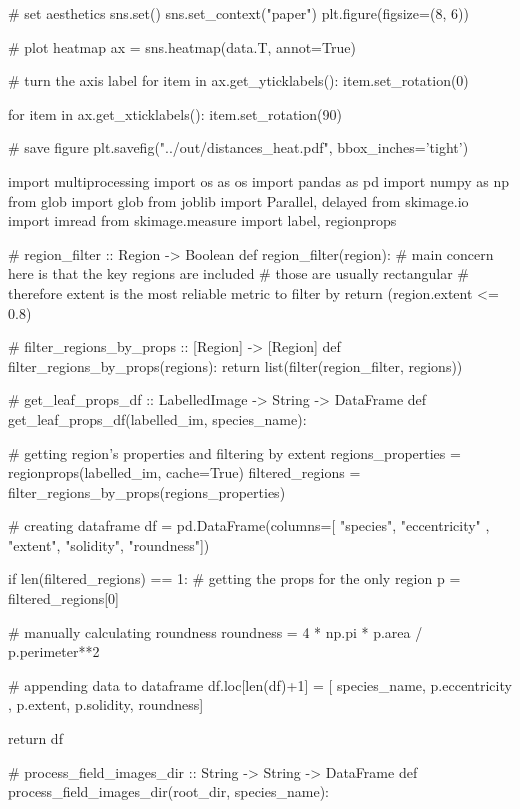 # set aesthetics
sns.set()
sns.set_context("paper")
plt.figure(figsize=(8, 6))

# plot heatmap
ax = sns.heatmap(data.T, annot=True)

# turn the axis label
for item in ax.get_yticklabels():
    item.set_rotation(0)

for item in ax.get_xticklabels():
    item.set_rotation(90)

# save figure
plt.savefig("../out/distances_heat.pdf", bbox_inches='tight')

\stopPYTHON

\subject{classify_field.py}

\startPYTHON
import multiprocessing
import os     as os
import pandas as pd
import numpy  as np
from   glob   import glob
from   joblib import Parallel, delayed
from   skimage.io         import imread
from   skimage.measure    import label, regionprops


# region_filter :: Region -> Boolean
def region_filter(region):
    # main concern here is that the key regions are included
    # those are usually rectangular
    # therefore extent is the most reliable metric to filter by
    return (region.extent <= 0.8)


# filter_regions_by_props :: [Region] -> [Region]
def filter_regions_by_props(regions):
    return list(filter(region_filter, regions))


# get_leaf_props_df :: LabelledImage -> String -> DataFrame
def get_leaf_props_df(labelled_im, species_name):

    # getting region's properties and filtering by extent
    regions_properties = regionprops(labelled_im, cache=True)
    filtered_regions = filter_regions_by_props(regions_properties)

    # creating dataframe
    df = pd.DataFrame(columns=[ "species", "eccentricity"
                              , "extent", "solidity", "roundness"])

    if len(filtered_regions) == 1:
        # getting the props for the only region
        p = filtered_regions[0]

        # manually calculating roundness
        roundness = 4 * np.pi * p.area / p.perimeter**2

        # appending data to dataframe
        df.loc[len(df)+1] = [ species_name, p.eccentricity
                            , p.extent, p.solidity, roundness]

    return df


# process_field_images_dir :: String -> String -> DataFrame
def process_field_images_dir(root_dir, species_name):

